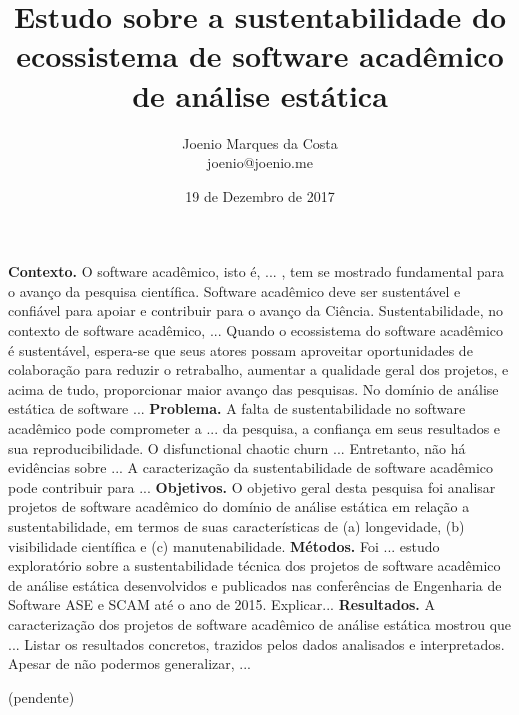 \documentclass[msc, classic, a4paper]{ufbathesis}
\date{19 de Dezembro de 2017}
\title{
  Estudo sobre a sustentabilidade do ecossistema de software acadêmico de
  análise estática
}
\author{Joenio Marques da Costa\\
  {\small joenio@joenio.me}
}
\begin{document}
\frontpage
\frontmatter
\presentationpage

\resumo

\textbf{Contexto.} 
O software acadêmico, isto é, ... ,
tem se mostrado fundamental para o avanço da pesquisa científica.
Software acadêmico deve ser sustentável e confiável para apoiar e contribuir para o avanço da Ciência.
%
Sustentabilidade, no contexto de software acadêmico,  ...
%
Quando o ecossistema do software acadêmico é sustentável, espera-se que seus atores possam aproveitar
oportunidades de colaboração para reduzir o retrabalho, aumentar a qualidade
geral dos projetos, e acima de tudo, proporcionar maior avanço das pesquisas.
No domínio de análise estática de software ...
%
\textbf{Problema.} 
A falta de sustentabilidade no software acadêmico pode comprometer 
a ... da pesquisa, a confiança em seus resultados e sua reproducibilidade.
%
O disfunctional chaotic churn ...
%
Entretanto, não há evidências sobre ...
A caracterização da sustentabilidade de software acadêmico 
pode contribuir para ...
%
\textbf{Objetivos.}
O objetivo geral desta pesquisa foi analisar projetos de software acadêmico 
do domínio de análise estática 
em relação a sustentabilidade, em termos de suas características de 
(a) longevidade, (b) visibilidade científica e (c) manutenabilidade.
%
\textbf{Métodos.}
Foi ... estudo exploratório sobre a sustentabilidade
técnica dos projetos de software acadêmico de análise estática desenvolvidos e
publicados nas conferências de Engenharia de Software ASE e SCAM até o ano de
2015.
Explicar...
%
\textbf{Resultados.}
A caracterização dos projetos de software acadêmico de análise estática
mostrou que ...
Listar os resultados concretos, trazidos pelos dados analisados e interpretados.
Apesar de não podermos generalizar, ...

\begin{keywords}

  (pendente)

\end{keywords}
\end{document}
